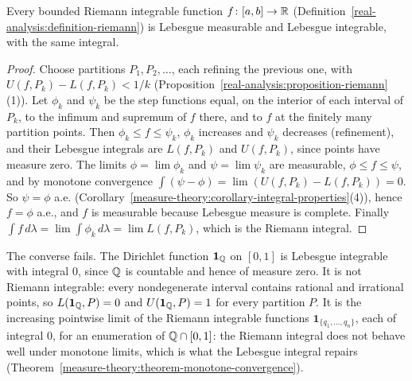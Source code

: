 \begin{proposition}\label{measure-theory:proposition-riemann-integrable}
Every bounded Riemann integrable function $f \colon [a, b] \to \mathbb{R}$ (Definition~\ref{real-analysis:definition-riemann}) is Lebesgue measurable and Lebesgue integrable, with the same integral.
\end{proposition}

\begin{proof}
Choose partitions $P_1, P_2, \ldots$, each refining the previous one, with $U(f, P_k) - L(f, P_k) < 1/k$ (Proposition~\ref{real-analysis:proposition-riemann}(1)). Let $\phi_k$ and $\psi_k$ be the step functions equal, on the interior of each interval of $P_k$,
to the infimum and supremum of $f$ there, and to $f$ at the finitely many partition points. Then $\phi_k \leq f \leq \psi_k$, $\phi_k$ increases and $\psi_k$ decreases (refinement), and their Lebesgue integrals are $L(f, P_k)$ and $U(f, P_k)$,
since points have measure zero. The limits $\phi = \lim\phi_k$ and $\psi = \lim\psi_k$ are measurable, $\phi \leq f \leq \psi$, and by monotone convergence $\int(\psi - \phi) = \lim(U(f, P_k) - L(f, P_k)) = 0$. So $\psi = \phi$ a.e.
(Corollary~\ref{measure-theory:corollary-integral-properties}(4)), hence $f = \phi$ a.e., and $f$ is measurable because Lebesgue measure is complete. Finally $\int f\,d\lambda = \lim\int\phi_k\,d\lambda = \lim L(f, P_k)$, which is the Riemann integral.
\end{proof}

\begin{counterexample}\label{measure-theory:counterexample-dirichlet}
The converse fails. The Dirichlet function $\mathbf{1}_{\mathbb{Q}}$ on $[0, 1]$ is Lebesgue integrable with integral $0$, since $\mathbb{Q}$ is countable and hence of measure zero. It is not Riemann integrable: every nondegenerate interval contains rational
and irrational points, so $L(\mathbf{1}_{\mathbb{Q}}, P) = 0$ and $U(\mathbf{1}_{\mathbb{Q}}, P) = 1$ for every partition $P$. It is the increasing pointwise limit of the Riemann integrable functions $\mathbf{1}_{\{q_1, \ldots, q_n\}}$, each of integral $0$, for an
enumeration of $\mathbb{Q} \cap [0, 1]$: the Riemann integral does not behave well under monotone limits, which is what the Lebesgue integral repairs (Theorem~\ref{measure-theory:theorem-monotone-convergence}).
\end{counterexample}

